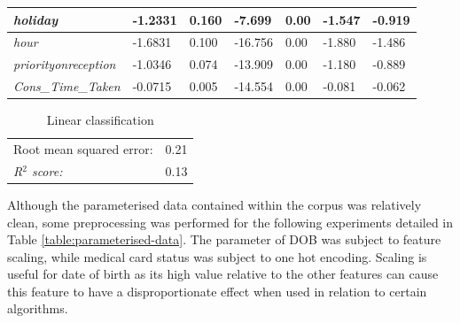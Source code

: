 \begin{table}[h]
\begin{center}
{\begin{tabular}{@{}lllllll@{}}
\textit{holiday}             & -1.2331                           & 0.160                                & -7.699                         & 0.00                                  & -1.547                                & -0.919                                \\ \midrule
\textit{hour}                & -1.6831                           & 0.100                                & -16.756                        & 0.00                                  & -1.880                                & -1.486                                \\ \midrule
\textit{priorityonreception} & -1.0346                           & 0.074                                & -13.909                        & 0.00                                  & -1.180                                & -0.889                                \\ \midrule
\textit{Cons\_Time\_Taken}   & -0.0715                           & 0.005                                & -14.554                        & 0.00                                  & -0.081                                & -0.062                                \\ \bottomrule
\end{tabular}
}

      \label{table-mlr0}
\end{center}
\end{table}



\begin{table}[h]
\centering
\caption{Linear classification}
\label{table-mlr1}
\begin{tabular}{@{}ll@{}}
\toprule
Root mean squared error:            & \multicolumn{1}{c}{0.21} \\ 
\textit{R$^2$ score:} & 0.13                     \\ \bottomrule
\end{tabular}
\end{table}

 
Although the parameterised data contained within the corpus was relatively clean, some preprocessing was performed for the following experiments detailed in Table \ref{table:parameterised-data}. The parameter of DOB was subject to feature scaling, while medical card status was subject to one hot encoding. Scaling is useful for date of birth as its high value relative to the other features can cause this feature to have a disproportionate effect when used in relation to certain algorithms.

